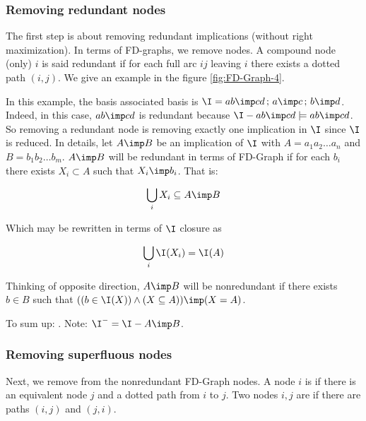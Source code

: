 \subsubsection{Removing redundant nodes}

The first step is about removing redundant implications (without right
maximization). In terms of FD-graphs, we remove  nodes. A
compound node (only) $i$ is said redundant if for each full arc $ij$ leaving $i$
there exists a dotted path $(i, j)$. We give an example in the figure
\ref{fig:FD-Graph-4}.



In this example, the basis associated basis is $\I = { ab \imp cd \, ; \, 
	a \imp c \, ; \, b \imp d}$. Indeed, in this case, $ab \imp cd$ is 
	redundant 
because $\I - {ab \imp cd} \models ab \imp cd$. So removing a redundant node is
removing exactly one implication in $\I$ since $\I$ is reduced. In details, let
$A \imp B$ be an implication of $\I$ with $A = a_1 a_2 \dots a_n$ and $B = b_1
b_2 \dots b_m$. $A \imp B$ will be redundant in terms of FD-Graph if for each 
$b_i$ there exists $X_i \subset A$ such that $X_i \imp b_i$. That is:

\[ \bigcup_i X_i \subseteq A \imp B \]

\noindent Which may be rewritten in terms of $\I$ closure as 

\[ \bigcup_i \I(X_i) = \I(A) \]

\noindent Thinking of opposite direction, $A \imp B$ will be nonredundant if
there exists $b \in B$ such that $((b \in \I(X)) \land (X \subseteq A)) \imp 
(X = A)$.

\vspace{1.2em}

\noindent To sum up: . Note:
$\I^{-} = \I - {A \imp B}$.  


\subsubsection{Removing superfluous nodes}

Next, we remove from the nonredundant FD-Graph  nodes. A 
node $i$ is  if there is an equivalent node $j$ and a 
dotted path from $i$ to $j$. Two nodes $i, j$ are  if there
are paths $(i, j)$ and $(j, i)$. 

